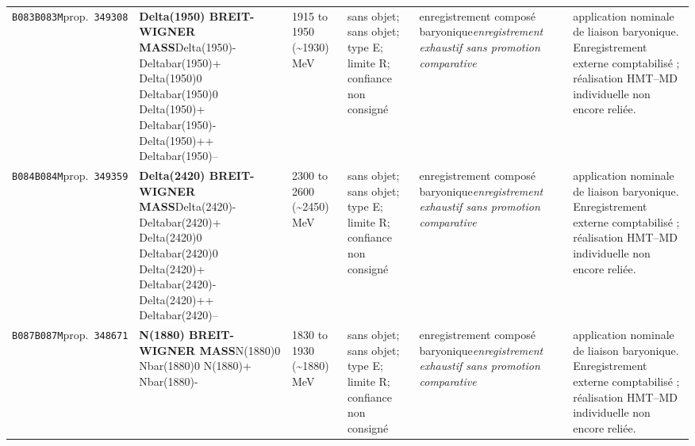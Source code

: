 \begin{landscape}
\begin{longtable}{L{1.85cm}L{4.45cm}L{2.35cm}L{4.05cm}L{3.35cm}L{7.15cm}}
\texttt{B083}\newline \texttt{B083M}\newline prop.\ \texttt{349308} & \textbf{Delta(1950) BREIT-WIGNER MASS}\newline Delta(1950)- \textbar{}\allowbreak{} Deltabar(1950)+ \textbar{}\allowbreak{} Delta(1950)0 \textbar{}\allowbreak{} Deltabar(1950)0 \textbar{}\allowbreak{} Delta(1950)+ \textbar{}\allowbreak{} Deltabar(1950)- \textbar{}\allowbreak{} Delta(1950)++ \textbar{}\allowbreak{} Deltabar(1950)-- & 1915 to 1950 (\textasciitilde{}1930)\,MeV & sans objet; sans objet; type E; limite R; confiance non consigné & enregistrement composé baryonique\newline \emph{enregistrement exhaustif sans promotion comparative} & application nominale de liaison baryonique. Enregistrement externe comptabilisé ; réalisation HMT--MD individuelle non encore reliée. \\
\texttt{B084}\newline \texttt{B084M}\newline prop.\ \texttt{349359} & \textbf{Delta(2420) BREIT-WIGNER MASS}\newline Delta(2420)- \textbar{}\allowbreak{} Deltabar(2420)+ \textbar{}\allowbreak{} Delta(2420)0 \textbar{}\allowbreak{} Deltabar(2420)0 \textbar{}\allowbreak{} Delta(2420)+ \textbar{}\allowbreak{} Deltabar(2420)- \textbar{}\allowbreak{} Delta(2420)++ \textbar{}\allowbreak{} Deltabar(2420)-- & 2300 to 2600 (\textasciitilde{}2450)\,MeV & sans objet; sans objet; type E; limite R; confiance non consigné & enregistrement composé baryonique\newline \emph{enregistrement exhaustif sans promotion comparative} & application nominale de liaison baryonique. Enregistrement externe comptabilisé ; réalisation HMT--MD individuelle non encore reliée. \\
\texttt{B087}\newline \texttt{B087M}\newline prop.\ \texttt{348671} & \textbf{N(1880) BREIT-WIGNER MASS}\newline N(1880)0 \textbar{}\allowbreak{} Nbar(1880)0 \textbar{}\allowbreak{} N(1880)+ \textbar{}\allowbreak{} Nbar(1880)- & 1830 to 1930 (\textasciitilde{}1880)\,MeV & sans objet; sans objet; type E; limite R; confiance non consigné & enregistrement composé baryonique\newline \emph{enregistrement exhaustif sans promotion comparative} & application nominale de liaison baryonique. Enregistrement externe comptabilisé ; réalisation HMT--MD individuelle non encore reliée. \\

\end{longtable}
\end{landscape}
